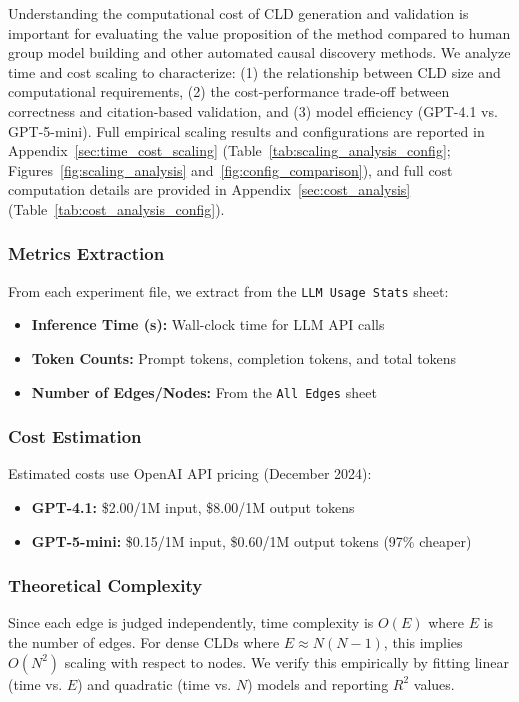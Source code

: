 Understanding the computational cost of CLD generation and validation is important for evaluating the value proposition of the method compared to human group model building and other automated causal discovery methods. We analyze time and cost scaling to characterize: (1) the relationship between CLD size and computational requirements, (2) the cost-performance trade-off between correctness and citation-based validation, and (3) model efficiency (GPT-4.1 vs. GPT-5-mini).
Full empirical scaling results and configurations are reported in Appendix~\ref{sec:time_cost_scaling} (Table~\ref{tab:scaling_analysis_config}; Figures~\ref{fig:scaling_analysis} and~\ref{fig:config_comparison}), and full cost computation details are provided in Appendix~\ref{sec:cost_analysis} (Table~\ref{tab:cost_analysis_config}).

\subsubsection{Metrics Extraction}
From each experiment file, we extract from the \texttt{LLM Usage Stats} sheet:
\begin{itemize}[noitemsep]
    \item \textbf{Inference Time (s):} Wall-clock time for LLM API calls
    \item \textbf{Token Counts:} Prompt tokens, completion tokens, and total tokens
    \item \textbf{Number of Edges/Nodes:} From the \texttt{All Edges} sheet
\end{itemize}

\subsubsection{Cost Estimation}
Estimated costs use OpenAI API pricing (December 2024):
\begin{itemize}[noitemsep]
    \item \textbf{GPT-4.1:} \$2.00/1M input, \$8.00/1M output tokens
    \item \textbf{GPT-5-mini:} \$0.15/1M input, \$0.60/1M output tokens (97\% cheaper)
\end{itemize}

\subsubsection{Theoretical Complexity}
Since each edge is judged independently, time complexity is $O(E)$ where $E$ is the number of edges. For dense CLDs where $E \approx N(N-1)$, this implies $O(N^2)$ scaling with respect to nodes. We verify this empirically by fitting linear (time vs. $E$) and quadratic (time vs. $N$) models and reporting $R^2$ values.

